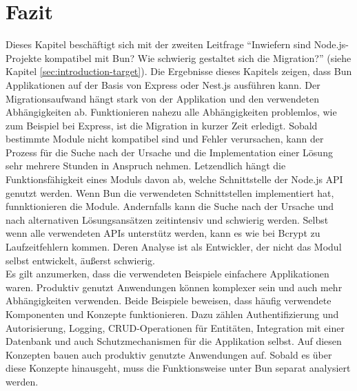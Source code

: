 \section{Fazit} \label{sec:compabitility-conclusion}
Dieses Kapitel beschäftigt sich mit der zweiten Leitfrage ``Inwiefern sind Node.js-Projekte kompatibel mit Bun? Wie schwierig gestaltet sich die Migration?'' (siehe Kapitel \ref{sec:introduction-target}). Die Ergebnisse dieses Kapitels zeigen, dass Bun Applikationen auf der Basis von Express oder Nest.js ausführen kann. Der Migrationsaufwand hängt stark von der Applikation und den verwendeten Abhängigkeiten ab. Funktionieren nahezu alle Abhängigkeiten problemlos, wie zum Beispiel bei Express, ist die Migration in kurzer Zeit erledigt. Sobald bestimmte Module nicht kompatibel sind und Fehler verursachen, kann der Prozess für die Suche nach der Ursache und die Implementation einer Lösung sehr mehrere Stunden in Anspruch nehmen. Letzendlich hängt die Funktionsfähigkeit eines Moduls davon ab, welche Schnittstelle der Node.js API genutzt werden. Wenn Bun die verwendeten Schnittstellen implementiert hat, funnktionieren die Module. Andernfalls kann die Suche nach der Ursache und nach alternativen Lösungsansätzen zeitintensiv und schwierig werden. Selbst wenn alle verwendeten APIs unterstütz werden, kann es wie bei Bcrypt zu Laufzeitfehlern kommen. Deren Analyse ist als Entwickler, der nicht das Modul selbst entwickelt, äußerst schwierig.\\

\noindent
Es gilt anzumerken, dass die verwendeten Beispiele einfachere Applikationen waren. Produktiv genutzt Anwendungen können komplexer sein und auch mehr Abhängigkeiten verwenden. Beide Beispiele beweisen, dass häufig verwendete Komponenten und Konzepte funktionieren. Dazu zählen Authentifizierung und Autorisierung, Logging, CRUD-Operationen für Entitäten, Integration mit einer Datenbank und auch Schutzmechanismen für die Applikation selbst. Auf diesen Konzepten bauen auch produktiv genutzte Anwendungen auf. Sobald es über diese Konzepte hinausgeht, muss die Funktionsweise unter Bun separat analysiert werden.